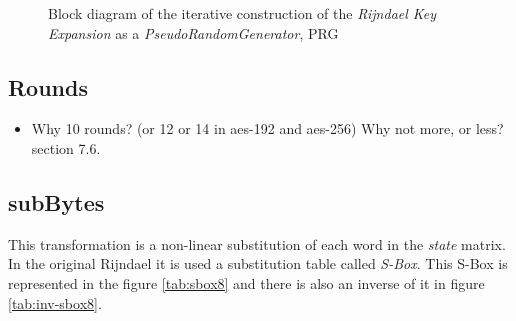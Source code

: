 \documentclass[10pt,a4paper,twoside]{llncs}
\begin{document}
\begin{figure}
\begin{center}
\begin{tikzpicture}[>=latex]
\end{tikzpicture}
\caption{Block diagram of the iterative construction of the \emph{Rijndael Key Expansion} as a \emph{PseudoRandomGenerator}, PRG}
\label{fig:keyExpansionDiagram}
\end{center}
\end{figure}

\subsection{Rounds}
\begin{itemize}
 \item Why 10 rounds? (or 12 or 14 in aes-192 and aes-256) Why not more, or less? \cite{Daemen01aes-ammended} section 7.6.
\end{itemize}


\subsection{subBytes}\label{sec:subBytes}
This transformation is a non-linear substitution of each word in the \emph{state} matrix. In the original Rijndael it is used a substitution table called \emph{S-Box}. This S-Box is represented in the figure \ref{tab:sbox8} and there is also an inverse of it in figure \ref{tab:inv-sbox8}.
\end{document}
